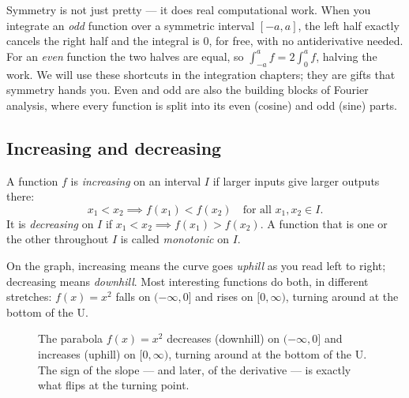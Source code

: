 \begin{connectionbox}
Symmetry is not just pretty --- it does real computational work. When you integrate
an \emph{odd} function over a symmetric interval $[-a,a]$, the left half exactly
cancels the right half and the integral is $0$, for free, with no antiderivative
needed. For an \emph{even} function the two halves are equal, so
$\int_{-a}^{a} f = 2\int_0^a f$, halving the work. We will use these shortcuts in
the integration chapters; they are gifts that symmetry hands you. Even and odd are
also the building blocks of Fourier analysis, where every function is split into
its even (cosine) and odd (sine) parts.
\end{connectionbox}

\subsection{Increasing and decreasing}

\begin{definition}
\label{ch02:def-monotone}
A function $f$ is \emph{increasing} on an interval $I$ if larger inputs give larger
outputs there:
\[
  x_1 < x_2 \implies f(x_1) < f(x_2) \quad\text{for all } x_1, x_2 \in I.
\]
It is \emph{decreasing} on $I$ if $x_1 < x_2 \implies f(x_1) > f(x_2)$. A function
that is one or the other throughout $I$ is called \emph{monotonic} on $I$.
\end{definition}

On the graph, increasing means the curve goes \emph{uphill} as you read left to
right; decreasing means \emph{downhill}. Most interesting functions do both, in
different stretches: $f(x)=x^2$ falls on $(-\infty,0]$ and rises on $[0,\infty)$,
turning around at the bottom of the U.

\begin{figure}[H]
\centering
{}
\caption{The parabola $f(x)=x^2$ decreases (downhill) on $(-\infty,0]$ and
increases (uphill) on $[0,\infty)$, turning around at the bottom of the U. The
sign of the slope --- and later, of the derivative --- is exactly what flips at the
turning point.}
\label{ch02:fig-monotonicity}
\end{figure}

